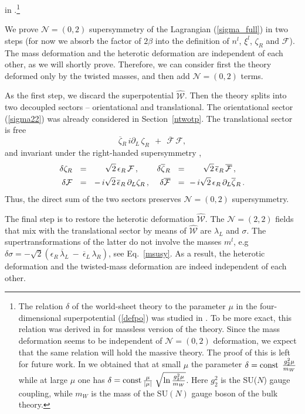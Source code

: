 \documentclass[12pt]{article}
\newcommand{\ntwot}{${\mathcal N}= \left(2,2\right) $ }
\newcommand{\ntwoo}{${\mathcal N}= \left(0,2\right) $ }
\newcommand{\p}{\partial}
\newcommand{\ov}{\overline}
\newcommand{\mc}[1]{\mathcal{#1}}
\newcommand{\bzr}{\ov{\zeta}{}_R}
\newcommand{\zr}{\zeta_R}
\newcommand{\lar}{\lambda_R}
\newcommand{\blal}{\ov{\lambda}{}_L}
\newcommand{\ff}{\mc{F}}
\newcommand{\bff}{\ov{\mc{F}}}
\newcommand{\eer}{\epsilon_R}
\newcommand{\beer}{\ov{\epsilon}{}_R}
\newcommand{\beel}{\ov{\epsilon}{}_L}
\begin{document}
in \cite{SYhet}.\footnote{The relation   $\delta$ of the
world-sheet theory to the  parameter $\mu$
in the four-dimensional  superpotential (\ref{defpo}) was studied in
\cite{SYhet,BSYhet}. To be more exact, this 
relation was derived in \cite{SYhet,BSYhet} for massless
version of the theory. Since 
the mass deformation seems to be  independent of \ntwoo deformation,
 we expect that the same 
relation will hold the massive theory. The proof of this is
left for  future work. In \cite{SYhet,BSYhet} we obtained that at small $\mu$ the parameter
$
\delta =
 {\rm const}\;\,\frac{g_2^2\mu}{m_W}$
 while at large $\mu$ one has $\delta =
 {\rm const}\,\frac{\mu}{|\mu|}\;
 \sqrt{\ln{\frac{g^2_2\mu}{m_W}}}$.
 Here $g_2^2$ is the SU($N$) gauge coupling, 
while $m_W$ is the mass of the SU$(N)$ gauge boson of the bulk theory.} 


        We prove \ntwoo supersymmetry of the Lagrangian 
        (\ref{sigma_full}) in two steps
	(for now we absorb the factor of $ 2\beta $ into the definition of $ n^l $, $ \xi^l $,
        $ \zeta_R $ and $ \mc{F} $).
        The mass  deformation and the heterotic deformation are independent of each other, as we will shortly prove.
Therefore,   we can consider  first the theory deformed only by the
twisted masses, and then add \ntwoo terms.

As the first step, we discard the superpotential $ \hat{\mc{W}} $.
        Then the theory splits into two decoupled sectors -- orientational and translational. 
        The orientational sector (\ref{sigma22}) was 
        already considered in Section~\ref{ntwotp}.
  The translational sector is free
\[
	\bzr\, i\p_L\, \zr ~~+~~ \bff\,\ff ,
\]
	and invariant under the right-handed supersymmetry \cite{SYhet},
\begin{align}
%
\notag
        \delta \zr & ~~=~~ ~~~~ \sqrt{2}\, \eer\, \ff\,,
        &
        \delta \bzr & ~~=~~ ~~~~ \sqrt{2}\, \beer\, \bff\,,
        \\
%
\label{tsusy}
        \delta \ff & ~~=~~ -\, i\sqrt{2}\, \beer\, \p_L \zr\,,
        &
        \delta \bff & ~~=~ -\, i\sqrt{2}\, \eer\, \p_L \bzr
        \,.
\end{align}
	Thus, the direct sum of the two sectors preserves \ntwoo supersymmetry.
	
	The final step is to restore the heterotic deformation $ \hat{\mc{W}} $. 
	The \ntwot fields that mix with the translational sector by means
	of $ \hat{\mc{W}} $ are $ \lambda_L $ and $ \sigma $.
	The supertransformations of the latter do not involve the masses $ m^l $, 
	e.g $ \delta\sigma = -\sqrt{2}
                              \left( \eer\, \blal ~-~ \beel\,\lar \right)$, 
                              see Eq.~\eqref{msusy}.
As a result,  the heterotic deformation and the twisted-mass deformation are indeed independent
of each other.
\end{document}
